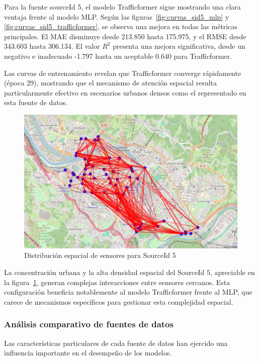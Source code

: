 Para la fuente sourceId 5, el modelo Trafficformer sigue mostrando una clara ventaja frente al modelo MLP. Según las figuras~\ref{fig:curvas_sid5_mlp} y \ref{fig:curvas_sid5_trafficformer}, se observa una mejora en todas las métricas principales. El MAE disminuye desde 213.850 hasta 175.975, y el RMSE desde 343.603 hasta 306.134. El valor $R^2$ presenta una mejora significativa, desde un negativo e inadecuado -1.797 hasta un aceptable 0.640 para Trafficformer.

Las curvas de entrenamiento revelan que Trafficformer converge rápidamente (época 29), mostrando que el mecanismo de atención espacial resulta particularmente efectivo en escenarios urbanos densos como el representado en esta fuente de datos.

\begin{figure}[H]
	\centering
	\includegraphics[width=0.7\linewidth]{includes/cap5/source_id_5_meters_mask.png}
	\caption{Distribución espacial de sensores para SourceId 5}
	\label{fig:sensores_sid5}
\end{figure}

La concentración urbana y la alta densidad espacial del SourceId 5, apreciable en la figura~\ref{fig:sensores_sid5}, generan complejas interacciones entre sensores cercanos. Esta configuración beneficia notablemente al modelo Trafficformer frente al MLP, que carece de mecanismos específicos para gestionar esta complejidad espacial.

\subsubsection{Análisis comparativo de fuentes de datos}

Las características particulares de cada fuente de datos han ejercido una influencia importante en el desempeño de los modelos.


